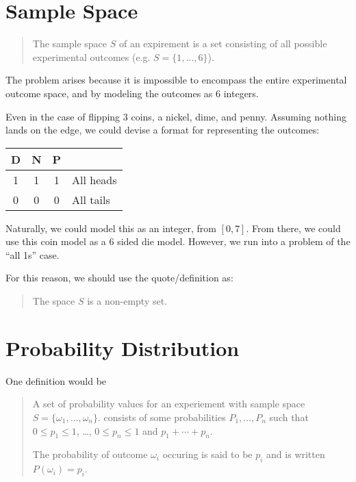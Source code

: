 \documentclass{article}
\begin{document}
\section*{Sample Space}

\begin{quote}
The sample space $S$ of an expirement is a set consisting of all
possible experimental outcomes (e.g. $S = \{1, \ldots, 6\}$).
\end{quote}

The problem arises because it is impossible to encompass the entire
experimental outcome space, and by modeling the outcomes as 6
integers.

Even in the case of flipping 3 coins, a nickel, dime, and
penny. Assuming nothing lands on the edge, we could devise a format
for representing the outcomes:

\begin{center}
\begin{tabular}{cccl}
D & N & P & \\
\hline
1 & 1 & 1 & All heads \\
0 & 0 & 0 & All tails
\end{tabular}
\end{center}

Naturally, we could model this as an integer, from $[0, 7]$. From
there, we could use this coin model as a 6 sided die model. However,
we run into a problem of the ``all 1s'' case.

For this reason, we should use the quote/definition as:

\begin{quote}
The space $S$ is a non-empty set.
\end{quote}

\section*{Probability Distribution}

One definition would be

\begin{quote}
A set of probability values for an experiement with sample space $S =
\{ \omega_1, \ldots, \omega_n \}$. consists of some probabilities
$P_1, \ldots, P_n$ such that $0 \le p_1 \le 1$, \ldots, $0 \le p_n \le 1$
and $p_1 + \cdots + p_n$.

The probability of outcome $\omega_i$ occuring is said to be $p_i$ and is
written $P(\omega_i) = p_i$.
\end{quote}
\end{document}
